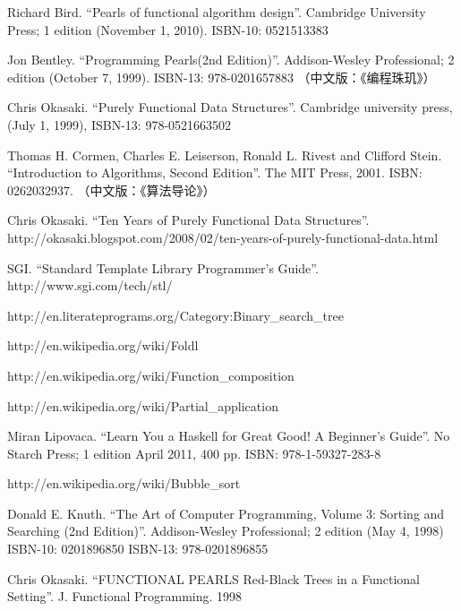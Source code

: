 \documentclass[UTF8]{article}
\begin{document}
\begin{thebibliography}{99}


Richard Bird. ``Pearls of functional algorithm design''. Cambridge University Press; 1 edition (November 1, 2010). ISBN-10: 0521513383

Jon Bentley. ``Programming Pearls(2nd Edition)''. Addison-Wesley Professional; 2 edition (October 7, 1999). ISBN-13: 978-0201657883 （中文版：《编程珠玑》）

Chris Okasaki. ``Purely Functional Data Structures''. Cambridge university press, (July 1, 1999), ISBN-13: 978-0521663502

Thomas H. Cormen, Charles E. Leiserson, Ronald L. Rivest and Clifford Stein. ``Introduction to Algorithms, Second Edition''. The MIT Press, 2001. ISBN: 0262032937. （中文版：《算法导论》）


Chris Okasaki. ``Ten Years of Purely Functional Data Structures''. http://okasaki.blogspot.com/2008/02/ten-years-of-purely-functional-data.html

SGI. ``Standard Template Library Programmer's Guide''. http://www.sgi.com/tech/stl/

http://en.literateprograms.org/Category:Binary\_search\_tree

http://en.wikipedia.org/wiki/Foldl

http://en.wikipedia.org/wiki/Function\_composition

http://en.wikipedia.org/wiki/Partial\_application

Miran Lipovaca. ``Learn You a Haskell for Great Good! A Beginner's Guide''. No Starch Press; 1 edition April 2011, 400 pp. ISBN: 978-1-59327-283-8

http://en.wikipedia.org/wiki/Bubble\_sort

Donald E. Knuth. ``The Art of Computer Programming, Volume 3: Sorting and Searching (2nd Edition)''. Addison-Wesley Professional; 2 edition (May 4, 1998) ISBN-10: 0201896850 ISBN-13: 978-0201896855

Chris Okasaki. ``FUNCTIONAL PEARLS Red-Black Trees in a Functional Setting''. J. Functional Programming. 1998


\end{thebibliography}
\end{document}
